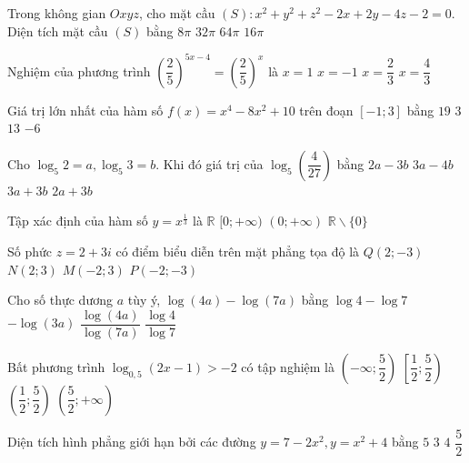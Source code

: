 \begin{ex}%
Trong không gian $O x y z$, cho mặt cầu $(S)\colon x^2+y^2+z^2-2 x+  2 y-4 z-2=0$. Diện tích mặt cầu $(S)$ bằng
\choice
{$8\pi$}
{\True $32\pi$}
{$64\pi$}
{$16\pi$}

\end{ex}
\begin{ex}%
Nghiệm của phương trình $\left(\dfrac{2}{5}\right)^{5 x-4}=\left(\dfrac{2}{5}\right)^{x}$ là
\choice
{\True $x=1$}
{$x=-1$}
{$x=\dfrac{2}{3}$}
{$x=\dfrac{4}{3}$}

\end{ex}
\begin{ex}%
Giá trị lớn nhất của hàm số $f(x)=x^4-8 x^2+10$ trên đoạn $[-1; 3]$ bằng
\choice
{\True $19$}
{$3$}
{$13$}
{$-6$}

\end{ex}
\begin{ex}%
Cho $\log_5 2=a, \log_5 3=b$. Khi đó giá trị của $\log_5\left(\dfrac{4}{27}\right)$ bằng
\choice
{\True $2 a-3 b$}
{$3 a-4 b$}
{$3 a+3 b$}
{$2 a+3 b$}

\end{ex}
\begin{ex}%
Tập xác định của hàm số $y=x^{\frac{1}{3}}$ là
\choice
{$\mathbb{R}$}
{$[0;+\infty)$}
{\True $(0;+\infty)$}
{$\mathbb{R} \backslash\{0\}$}

\end{ex}
\begin{ex}%
Số phức $z=2+3 i$ có điểm biểu diễn trên mặt phẳng tọa độ là
\choice
{$Q(2;-3)$}
{\True $N(2; 3)$}
{$M(-2; 3)$}
{$P(-2;-3)$}

\end{ex}
\begin{ex}%
Cho số thực dương $a$ tùy ý, $\log (4 a)-\log (7 a)$ bằng
\choice
{\True $\log 4-\log 7$}
{$-\log (3 a)$}
{$\dfrac{\log (4 a)}{\log (7 a)}$}
{$\dfrac{\log 4}{\log 7}$}

\end{ex}
\begin{ex}%
Bất phương trình $\log_{0,5}(2 x-1)>-2$ có tập nghiệm là
\choice
{$\left(-\infty; \dfrac{5}{2}\right)$}
{$\left[\dfrac{1}{2}; \dfrac{5}{2}\right)$}
{\True $\left(\dfrac{1}{2}; \dfrac{5}{2}\right)$}
{$\left(\dfrac{5}{2};+\infty\right)$}

\end{ex}
\begin{ex}%
Diện tích hình phẳng giới hạn bởi các đường $y=7-2 x^2, y=x^2+4$ bằng
\choice
{$5$}
{$3$}
{\True $4$}
{$\dfrac{5}{2}$}

\end{ex}
